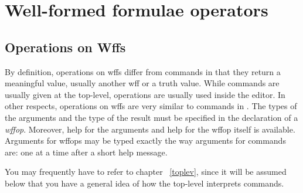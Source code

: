 \chapter{Well-formed formulae operators}

\section{Operations on Wffs}

By definition, operations on wffs differ from commands in that they
return a meaningful value, usually another wff or a truth value.  While
commands are usually given at the top-level, operations are usually
used inside the editor.  In other respects, operations on wffs are very
similar to commands in \tps.  The types of the arguments and the type of
the result must be specified in the declaration of a {\it wffop}.
Moreover, help for the arguments and help for the wffop itself is
available.  Arguments for wffops may be typed exactly the way arguments
for commands are:  one at a time after a short help message.

You may frequently have to refer to chapter ~\ref{toplev}, since it will
be assumed below that you have a general idea of how the \TPS top-level
interprets commands.

